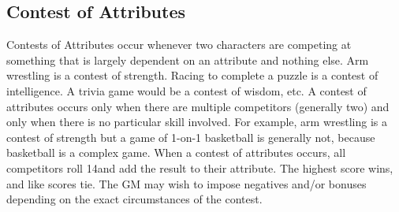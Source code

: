 \documentclass[twoside]{book}
\begin{document}
\subsection{Contest of Attributes}
     Contests of Attributes occur whenever two characters
               are competing at something that is largely dependent on an
               attribute and nothing else. Arm wrestling is a contest of
               strength. Racing to complete a puzzle is a contest of
               intelligence. A trivia game would be a contest of wisdom,
               etc.  A contest of attributes occurs only when there are
               multiple competitors (generally two) and only when there
               is no particular skill involved. For example, arm
               wrestling is a contest of strength but a game of 1-on-1
               basketball is generally not, because basketball is a
               complex game.  When a contest of attributes occurs, all competitors
               roll 14and add the result to their attribute. The
               highest score wins, and like scores tie. The GM may wish
               to impose negatives and/or bonuses depending on the exact
               circumstances of the contest. 
  
\end{document}
